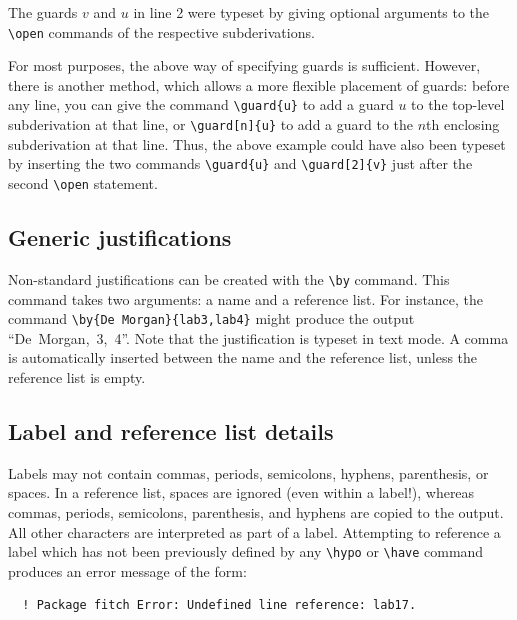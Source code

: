 \documentclass{ltxdoc}
\begin{document}
The guards $v$ and $u$ in line 2 were typeset by giving optional
arguments to the \verb!\open! commands of the respective
subderivations. 

\DescribeMacro{\guard}
For most purposes, the above way of specifying guards is sufficient.
However, there is another method, which allows a more flexible
placement of guards: before any line, you can give the command
\verb!\guard{u}! to add a guard $u$ to the top-level subderivation at
that line, or \verb!\guard[n]{u}! to add a guard to the $n$th
enclosing subderivation at that line. Thus, the above example could
have also been typeset by inserting the two commands \verb!\guard{u}! and
\verb!\guard[2]{v}! just after the second \verb!\open! statement.


\subsection{Generic justifications}

Non-standard justifications can be created with the \verb!\by!
command. This command takes two arguments: a name and a reference
list. For instance, the command \verb!\by{De Morgan}{lab3,lab4}! might
produce the output ``\mbox{De Morgan, 3, 4}''. Note that the justification
is typeset in text mode. A comma is automatically inserted between the
name and the reference list, unless the reference list is empty.

\subsection{Label and reference list details}

Labels may not contain commas, periods, semicolons, hyphens,
parenthesis, or spaces. In a reference list, spaces are ignored (even
within a label!), whereas commas, periods, semicolons, parenthesis,
and hyphens are copied to the output. All other characters are
interpreted as part of a label. Attempting to reference a label which
has not been previously defined by any \verb!\hypo! or \verb!\have!
command produces an error message of the form:

\begin{verbatim}
  ! Package fitch Error: Undefined line reference: lab17.
\end{verbatim}
\end{document}
